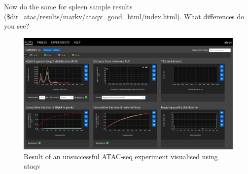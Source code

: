 \documentclass[12pt]{article}
\begin{document}
			Now do the same for spleen sample results (\$dir\_atac/results/markv/ataqv\_good\_html/index.html). 
			What differences do you see?
			
			\begin{figure}[H]
				\includegraphics[width=\textwidth]{ataqv_bad.png}
				\caption{Result of an unsuccessful  ATAC-seq experiment visualised using ataqv}
				\label{fig:ataqv_bad}
			\end{figure}
	

	
\end{document}
